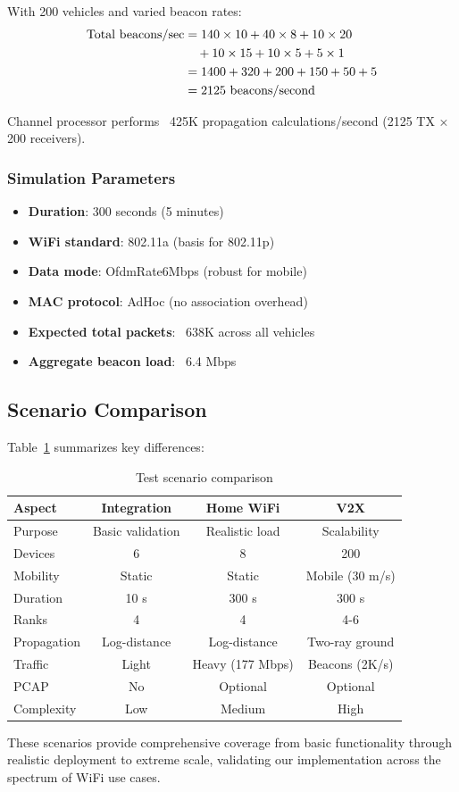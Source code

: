With 200 vehicles and varied beacon rates:
\begin{align}
\text{Total beacons/sec} &= 140 \times 10 + 40 \times 8 + 10 \times 20 \notag \\
&\quad + 10 \times 15 + 10 \times 5 + 5 \times 1 \notag \\
&= 1400 + 320 + 200 + 150 + 50 + 5 \notag \\
&= 2125 \text{ beacons/second}
\end{align}

Channel processor performs ~425K propagation calculations/second (2125 TX × 200 receivers).

\subsubsection{Simulation Parameters}

\begin{itemize}
    \item \textbf{Duration}: 300 seconds (5 minutes)
    \item \textbf{WiFi standard}: 802.11a (basis for 802.11p)
    \item \textbf{Data mode}: OfdmRate6Mbps (robust for mobile)
    \item \textbf{MAC protocol}: AdHoc (no association overhead)
    \item \textbf{Expected total packets}: ~638K across all vehicles
    \item \textbf{Aggregate beacon load}: ~6.4 Mbps
\end{itemize}

\subsection{Scenario Comparison}

Table~\ref{tab:scenario-comparison} summarizes key differences:

\begin{table}[htbp]
\centering
\caption{Test scenario comparison}
\label{tab:scenario-comparison}
\small
\begin{tabular}{@{}lccc@{}}
\toprule
\textbf{Aspect} & \textbf{Integration} & \textbf{Home WiFi} & \textbf{V2X} \\
\midrule
Purpose & Basic validation & Realistic load & Scalability \\
Devices & 6 & 8 & 200 \\
Mobility & Static & Static & Mobile (30 m/s) \\
Duration & 10 s & 300 s & 300 s \\
Ranks & 4 & 4 & 4-6 \\
Propagation & Log-distance & Log-distance & Two-ray ground \\
Traffic & Light & Heavy (177 Mbps) & Beacons (2K/s) \\
PCAP & No & Optional & Optional \\
Complexity & Low & Medium & High \\
\bottomrule
\end{tabular}
\end{table}

These scenarios provide comprehensive coverage from basic functionality through realistic deployment to extreme scale, validating our implementation across the spectrum of WiFi use cases.
